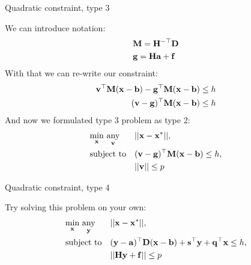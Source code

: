 \documentclass{beamer}
\begin{document}
\begin{frame}{Quadratic constraint, type 3}
\begin{flushleft}

We can introduce notation:
%
\begin{align}
    & \mathbf{M} = \mathbf{H}^{-\top} \mathbf{D} \\
    & \mathbf{g} = \mathbf{H}\mathbf{a} + \mathbf{f}
\end{align}
With that we can re-write our constraint:
%
\begin{align}
    \mathbf{v}^\top \mathbf{M} (\mathbf{x} - \mathbf{b}) - \mathbf{g}^\top \mathbf{M} (\mathbf{x} - \mathbf{b}) \leq h \\
    (\mathbf{v} - \mathbf{g})^\top \mathbf{M} (\mathbf{x} - \mathbf{b}) \leq h 
\end{align}
%
And now we formulated type 3 problem as type 2:
%
\begin{equation}
\begin{aligned}
& \underset{\mathbf{x}}{\text{min}} \ \underset{\mathbf{v}}{\text{any}}
& & ||\mathbf{x} - \mathbf{x}^*||, \\
& \text{subject to}
& & (\mathbf{v} - \mathbf{g})^\top \mathbf{M} (\mathbf{x} - \mathbf{b}) \leq h, \\
& & & ||\mathbf{v}|| \leq p
\end{aligned}
\end{equation}

 
\end{flushleft}
\end{frame}



\begin{frame}{Quadratic constraint, type 4}
\begin{flushleft}

Try solving this problem on your own:
%
\begin{equation}
\begin{aligned}
& \underset{\mathbf{x}}{\text{min}} \ \underset{\mathbf{y}}{\text{any}}
& & ||\mathbf{x} - \mathbf{x}^*||, \\
& \text{subject to}
& & (\mathbf{y} - \mathbf{a})^\top \mathbf{D} (\mathbf{x} - \mathbf{b})  + 
\mathbf{s}^\top \mathbf{y} + \mathbf{q}^\top \mathbf{x} \leq h, \\
& & & ||\mathbf{H}\mathbf{y} + \mathbf{f}|| \leq p
\end{aligned}
\end{equation}
 
\end{flushleft}
\end{frame}
\end{document}
